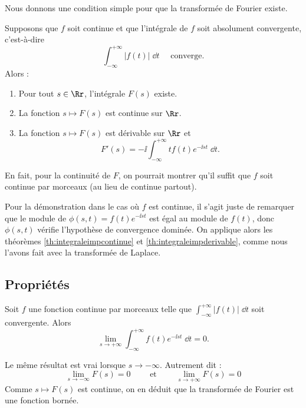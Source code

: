\documentclass[class=report,crop=false]{standalone}
\begin{document}
Nous donnons une condition simple pour que la transformée de Fourier existe.

\begin{proposition}
\label{prop:fourier1}
Supposons que $f$ soit continue et que l'intégrale de $f$ soit absolument convergente, c'est-à-dire
$$\int_{-\infty}^{+\infty} \big| f(t) \big| \;\dd t \quad \text{ converge.}$$
Alors :
\begin{enumerate}
  \item Pour tout $s \in \Rr$, l'intégrale $F(s)$ existe. 
  
  \item La fonction $s \mapsto F(s)$ est continue sur $\Rr$.
  
  \item La fonction $s \mapsto F(s)$ est dérivable sur $\Rr$
  et 
  $$F'(s) = -\ii\int_{-\infty}^{+\infty} tf(t) e^{-\ii st}\;\dd t.$$
\end{enumerate}
\end{proposition}

En fait, pour la continuité de $F$, on pourrait montrer qu'il suffit 
que $f$ soit continue par morceaux (au lieu de continue partout).

Pour la démonstration dans le cas où $f$ est continue, il s'agit juste de remarquer que le module
de $\phi(s,t) = f(t) e^{-\ii st}$ est égal au module de $f(t)$,
donc $\phi(s,t)$ vérifie l'hypothèse de convergence dominée.
On applique alors les théorèmes \ref{th:integraleimpcontinue} et 
\ref{th:integraleimpderivable}, comme nous 
l'avons fait avec la transformée de Laplace.



\subsection{Propriétés}

\begin{lemme}
Soit $f$ une fonction continue par morceaux 
telle que  $\int_{-\infty}^{+\infty} \big| f(t) \big| \;\dd t$
soit convergente.
Alors 
$$\lim_{s\to+\infty} \int_{-\infty}^{+\infty} f(t) e^{-\ii st}\;\dd t = 0.$$
\end{lemme}

Le même résultat est vrai lorsque $s\to-\infty$.
Autrement dit :
$$\lim_{s\to-\infty} F(s) = 0 \qquad \text{ et } \qquad \lim_{s\to+\infty} F(s) = 0$$
Comme $s\mapsto F(s)$ est continue, on en déduit que la transformée de Fourier
est une fonction bornée.
\end{document}
